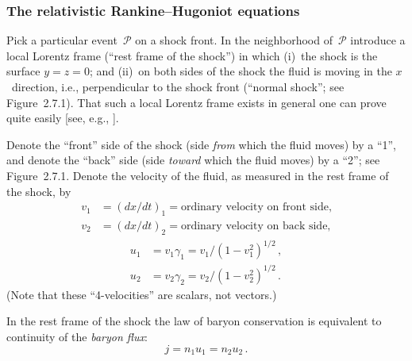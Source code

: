 


\subsubsection*{The relativistic Rankine--Hugoniot equations}

Pick a particular event~$\mathscr{P}$ on a shock front.  In the neighborhood
of~$\mathscr{P}$ introduce a local Lorentz frame (``rest frame of the
shock'') in which (i)~the shock is the surface $y = z = 0$; and (ii)~on both
sides of the shock the fluid is moving in the $x$~direction, i.e.,
perpendicular to the shock front (``normal shock''; see Figure~2.7.1).
That such a local Lorentz frame exists in general one can prove quite easily
[see, e.g., \citet{Taub1948}].

Denote the ``front'' side of the shock (side \emph{from} which the fluid
moves) by a ``1'', and denote the ``back'' side (side \emph{toward} which the
fluid moves) by a ``2''; see Figure~2.7.1.  Denote the velocity of the fluid,
as measured in the rest frame of the shock, by
%
\begin{align}
  v_1 &= (dx/dt)_1 = \text{ordinary velocity on front side,}
  \tag{2.7.1a} \\
  v_2 &= (dx/dt)_2 = \text{ordinary velocity on back side,}
  \tag{2.7.1b}
\end{align}
%
\begin{align}
  u_1 &= v_1\gamma_1 = v_1/(1 - v_1^{2})^{1/2}\,,
  \tag{2.7.1c} \\
  u_2 &= v_2\gamma_2 = v_2/(1 - v_2^{2})^{1/2}\,.
  \tag{2.7.1d}
\end{align}
%
(Note that these ``4-velocities'' are scalars, not vectors.)

In the rest frame of the shock the law of baryon conservation is equivalent
to continuity of the \emph{baryon flux}:
%
\begin{equation}
  j = n_1 u_1 = n_2 u_2\,.
  \tag{2.7.2a}
\end{equation}

